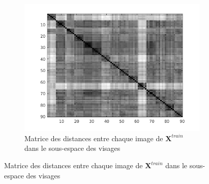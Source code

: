 \documentclass[a4paper]{article}
\begin{document}
\begin{figure}[H]
    \centering

    \begin{subfigure}[c]{0.6\textwidth}
        \centering
        \includegraphics[width=\textwidth]{images/ex4_bonus5mat.png}
        \caption{Matrice des distances entre chaque image de $\mathbf{X}^{train}$
        dans le sous-espace des visages}
        \label{subfig:ex4-bonus5mat}
    \end{subfigure}


\end{figure}
\end{document}
